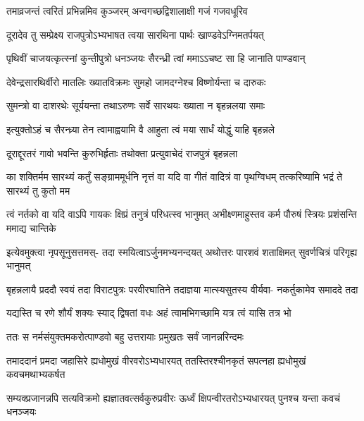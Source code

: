 \twolineshloka
{तमाव्रजन्तं त्वरितं प्रभिन्नमिव कुञ्जरम्}
{अन्वगच्छद्विशालाक्षी गजं गजवधूरिव}


\twolineshloka
{दूरादेव तु सम्प्रेक्ष्य राजपुत्रोऽभ्यभाषत}
{त्वया सारथिना पार्थः खाण्डवेऽग्निमतर्पयत्}


\twolineshloka
{पृथिवीं चाजयत्कृत्स्नां कुन्तीपुत्रो धनञ्जयः}
{सैरन्ध्री त्वां ममाऽऽचष्ट सा हि जानाति पाण्डवान्}


\twolineshloka
{देवेन्द्रसारथिर्वीरो मातलिः ख्यातविक्रमः}
{सुमहो जामदग्नेश्च विष्णोर्यन्ता च दारुकः}


\twolineshloka
{सुमन्त्रो वा दाशरथेः सूर्ययन्ता तथाऽरुणः}
{सर्वे सारथयः ख्याता न बृहन्नलया समाः}


\twolineshloka
{इत्युक्तोऽहं च सैरन्ध्र्या तेन त्वामाह्वयामि वै}
{आहुता त्वं मया सार्धं योद्धुं याहि बृहन्नले}


\twolineshloka
{दूराद्दूरतरं गावो भवन्ति कुरुभिर्हृताः}
{तथोक्ता प्रत्युवाचेदं राजपुत्रं बृहन्नला}


\threelineshloka
{का शक्तिर्मम सारथ्यं कर्तुं सङ्ग्राममूर्धनि}
{नृत्तं वा यदि वा गीतं वादित्रं वा पृथग्विधम्}
{तत्करिष्यामि भद्रं ते सारथ्यं तु कुतो मम}




\fourlineindentedshloka
{त्वं नर्तको वा यदि वाऽपि गायकः}
{क्षिप्रं तनुत्रं परिधत्स्व भानुमत्}
{अभीक्ष्णमाहुस्तव कर्म पौरुषं}
{स्त्रियः प्रशंसन्ति ममाद्य चान्तिके}



\fourlineindentedshloka
{इत्येवमुक्त्वा नृपसूनुसत्तमस्-}
{तदा स्मयित्वाऽर्जुनमभ्यनन्दयत्}
{अथोत्तरः पारशवं शताक्षिमत्}
{सुवर्णचित्रं परिगृह्य भानुमत्}


\fourlineindentedshloka
{बृहन्नलायै प्रददौ स्वयं तदा}
{विराटपुत्रः परवीरघातिने}
{तदाज्ञया मात्स्यसुतस्य वीर्यवा-}
{नकर्तुकामेव समाददे तदा}




\twolineshloka
{यद्यस्ति च रणे शौर्यं शक्यः स्याद् द्विषतां वधः}
{अहं त्वामभिगच्छामि यत्र त्वं यासि तत्र भो}



\twolineshloka
{ततः स नर्मसंयुक्तमकरोत्पाण्डवो बहु}
{उत्तरायाः प्रमुखतः सर्वं जानन्नरिन्दमः}


\fourlineindentedshloka
{तमाददानं प्रमदा जहासिरे}
{ह्यधोमुखं वीरवरोऽभ्यधारयत्}
{ततस्तिरश्चीनकृतं सपत्नहा}
{ह्यधोमुखं कवचमथाभ्यकर्षत}


\fourlineindentedshloka
{सम्यक्प्रजानन्नपि सत्यविक्रमो}
{ह्यज्ञातवत्सर्वकुरुप्रवीरः}
{ऊर्ध्वं क्षिपन्वीरतरोऽभ्यधारयत्}
{पुनश्च यन्ता कवचं धनञ्जयः}


